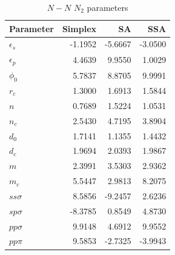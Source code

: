 \begin{table}[!thb]
\caption{$N-N$ $N_2$ parameters}
\label{tablen2}
\begin{center}
\begin{tabular}{|l|r|r|r|}
\hline
Parameter & Simplex & SA & SSA\\
\hline
\hline
$\epsilon_s$&-1.1952&-5.6667&-3.0500\\
\hline
$\epsilon_p$&4.4639&9.9550&1.0029\\
\hline
$\phi_0$&5.7837&8.8705&9.9991\\
\hline
$r_c$&1.3000&1.6913&1.5844\\
\hline
$n$&0.7689&1.5224&1.0531\\
\hline
$n_c$&2.5430&4.7195&3.8904\\
\hline
$d_0$&1.7141&1.1355&1.4432\\
\hline
$d_c$&1.9694&2.0393&1.9867\\
\hline
$m$&2.3991&3.5303&2.9362\\
\hline
$m_c$&5.5447&2.9813&8.2075\\
\hline
$ss\sigma$&8.5856&-9.2457&2.6236\\
\hline
$sp\sigma$&-8.3785& 0.8549&4.8730\\
\hline
$pp\sigma$&9.9148&4.6912&9.9552\\
\hline
$pp\pi$&9.5853&-2.7325&-3.9943\\
\hline
\end{tabular}
\end{center}
\end{table}
%
